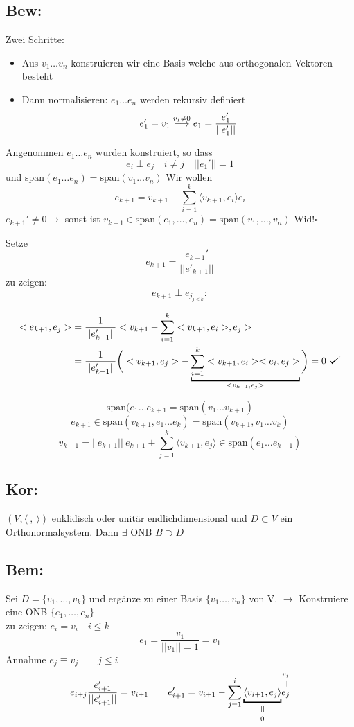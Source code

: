\documentclass[titlepage,12pt,a4paper,ngerman]{report}
\newenvironment{bew}[1]{\subsection{Bew: #1}}{\hfill$\square$}
\def\checkmark{\tikz\fill[scale=0.4](0,.35) -- (.25,0) -- (1,.7) -- (.25,.15) -- cycle;}
\newcommand{\Bew}[2]{\begin{bew}{#1}#2\end{bew}}
\newcommand{\verteq}{\rotatebox{90}{$\,=$}}
\newcommand{\equalto}[2]{\underset{\scriptstyle\overset{\mkern4mu\verteq}{#2}}{#1}}
\newcommand{\equaltoup}[2]{\overset{\scriptstyle\underset{\mkern4mu\verteq}{#2}}{#1}}
\newcommand{\tx}[1]{\textrm{#1}}
\newcommand{\spa}{\tx{span}}
\newcommand{\summ}[2]{\sum_{#1}^{#2}}
\begin{document}
\Bew{}{Zwei Schritte: 
\begin{itemize}
	\item Aus $v_1 \dots v_n$ konstruieren wir eine Basis welche aus orthogonalen Vektoren besteht
	\item Dann normalisieren: $e_1 \dots e_n$ werden rekursiv definiert
	$$e_1' = v_1 \buildrel{v_1 \neq 0}\over{\longrightarrow} e_1 = \frac{e_1'}{||e_1'||}$$
\end{itemize}

Angenommen $e_1 \dots e_n$ wurden konstruiert, so dass $$e_i \perp e_j \quad i \neq j \quad ||e_1'|| = 1$$ und $\spa (e_1 \dots e_n) = \spa (v_1 \dots v_n)$ Wir wollen
$$e_{k+1} = v_{k +1} - \summ{i=1}{k} \langle v_{k+1}, e_i \rangle e_i$$
	$e_{k+1}' \neq 0 \rightarrow$ sonst ist $v_{k+1} \in \spa (e_1, \dots, e_n) = \spa (v_1, \dots, v_n)$ Wid!}

Setze 
$$ e_{k+1} = \frac{e_{k+1}'}{||e'_{k+1}||}$$
zu zeigen:
$$e_{k+1} \perp e_{j_{j \le k}} :$$

\begin{align*}
< e_{k+1},e_j> &= \frac{1}{||e'_{k+1}||} < v_{k+1} - \sum_{i=1}^{k}< v_{k+1} , e_i > ,e_j>\\
&=\frac{1}{||e'_{k+1}||} \bigg( <v_{k+1},e_j> - \underbracket{\sum_{i=1}^{k} <v_{k+1},e_i> < e_i,e_j>  }_{<v_{k+1},e_j>} \bigg) = 0 \ \checkmark
\end{align*}

$$\spa (e_1 \dots e_{k + 1} = \spa (v_1 \dots v_{k + 1})$$
$$e_{k + 1} \in \spa ( v_{k + 1}, e_1 \dots e_k) = \spa(v_{k+1},v_1 \dots v_k)$$
$$v_{k+1} = ||e_{k+1}||\ e_{k+1}+\summ{j=1}{k} \langle v_{k+1}, e_j \rangle \in \spa (e_1 \dots e_{k+1})$$

\subsection{Kor:}
$ (V,\langle \ ,\ \rangle) $ euklidisch oder unitär endlichdimensional und $ D \subset V $ ein Orthonormalsystem. Dann $ \exists $ ONB $ B \supset D $ 
\subsection{Bem:}
Sei $ D = \{v_1,\dots,v_k \} $ und ergänze zu einer Basis $ \{v_1 \dots,v_n \} $ von V. $ \rightarrow $ Konstruiere eine ONB $ \{e_1,\dots,e_n\} $\\
zu zeigen: $ e_i = v_i \quad i \le k $\\
$$ e_1 = \frac{v_1}{||v_1|| =1} = v_1 $$
Annahme $ e_j \equiv v_j \qquad j \le i $\\
$$ e_{i+j} \frac{e'_{i+1}}{||e'_{i+1}||} = v_{i+1} \qquad e'_{i+1} = v _{i+1} - \sum_{j=1}^{i} \equalto{\underbracket{\langle v_{i+1},e_j \rangle }}{0} \equaltoup{e_j}{v_j}$$ 
\end{document}
